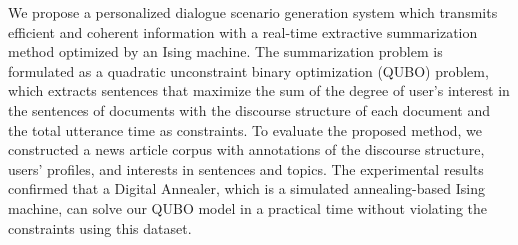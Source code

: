 We propose a personalized dialogue scenario generation system which transmits efficient and coherent information with a real-time extractive summarization method optimized by an Ising machine. The summarization problem is formulated as a quadratic unconstraint binary optimization (QUBO) problem, which extracts sentences that maximize the sum of the degree of user's interest in the sentences of documents with the discourse structure of each document and the total utterance time as constraints. To evaluate the proposed method, we constructed a news article corpus with annotations of the discourse structure, users' profiles, and interests in sentences and topics. The experimental results confirmed that a Digital Annealer, which is a simulated annealing-based Ising machine, can solve our QUBO model in a practical time without violating the constraints using this dataset.
